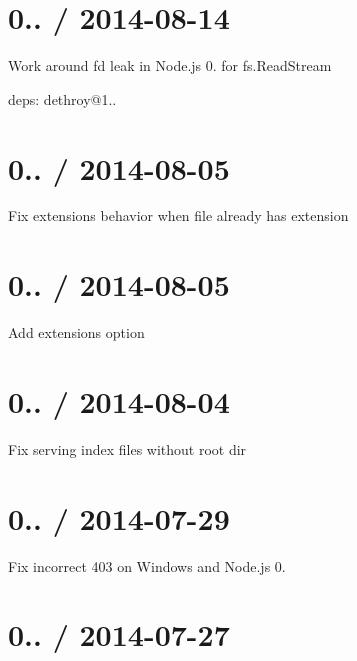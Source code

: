 \section*{0.. / 2014-\/08-\/14 }


\begin{DoxyItemize}
\item Work around {\ttfamily fd} leak in Node.\+js 0. for {\ttfamily fs.\+Read\+Stream}
\item deps\+: dethroy@1..
\end{DoxyItemize}

\section*{0.. / 2014-\/08-\/05 }


\begin{DoxyItemize}
\item Fix {\ttfamily extensions} behavior when file already has extension
\end{DoxyItemize}

\section*{0.. / 2014-\/08-\/05 }


\begin{DoxyItemize}
\item Add {\ttfamily extensions} option
\end{DoxyItemize}

\section*{0.. / 2014-\/08-\/04 }


\begin{DoxyItemize}
\item Fix serving index files without root dir
\end{DoxyItemize}

\section*{0.. / 2014-\/07-\/29 }


\begin{DoxyItemize}
\item Fix incorrect 403 on Windows and Node.\+js 0.
\end{DoxyItemize}

\section*{0.. / 2014-\/07-\/27 }


